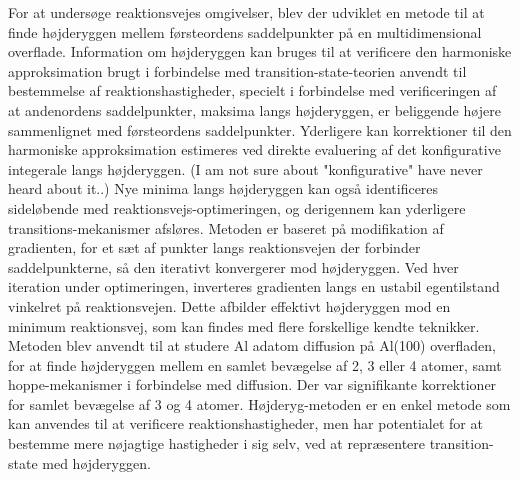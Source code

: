 For at undersøge reaktionsvejes omgivelser, blev der udviklet en metode til at finde højderyggen mellem førsteordens saddelpunkter på en multidimensional overflade.
Information om højderyggen kan bruges til at verificere den harmoniske approksimation brugt i forbindelse med transition-state-teorien anvendt til bestemmelse af reaktionshastigheder, specielt i forbindelse med verificeringen af at andenordens saddelpunkter, maksima langs højderyggen, er beliggende højere sammenlignet med førsteordens saddelpunkter.
Yderligere kan korrektioner til den harmoniske approksimation estimeres ved direkte evaluering af det konfigurative integerale langs højderyggen. (I am not sure about "konfigurative" have never heard about it..)
Nye minima langs højderyggen kan også identificeres sideløbende med reaktionsvejs-optimeringen, og derigennem kan yderligere transitions-mekanismer afsløres.
Metoden er baseret på modifikation af gradienten, for et sæt af punkter langs reaktionsvejen der forbinder saddelpunkterne, så den iterativt konvergerer mod højderyggen.
Ved hver iteration under optimeringen, inverteres gradienten langs en ustabil egentilstand vinkelret på reaktionsvejen. Dette afbilder effektivt højderyggen mod en minimum reaktionsvej, som kan findes med flere forskellige kendte teknikker.
Metoden blev anvendt til at studere Al adatom diffusion på Al(100) overfladen, for at finde højderyggen mellem en samlet bevægelse af 2, 3 eller 4 atomer, samt hoppe-mekanismer i forbindelse med diffusion.
Der var signifikante korrektioner for samlet bevægelse af 3 og 4 atomer. 
Højderyg-metoden er en enkel metode som kan anvendes til at verificere reaktionshastigheder, men har potentialet for at bestemme mere nøjagtige hastigheder i sig selv, ved at repræsentere transition-state med højderyggen.



